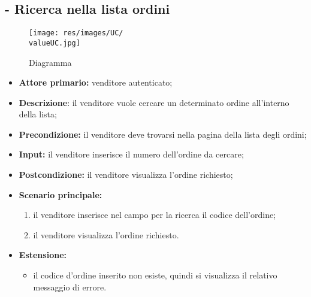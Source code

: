 \subsection{- Ricerca nella lista ordini}
\begin{figure}[H]
    \centering
    \texttt{[image: res/images/UC/\\valueUC.jpg]}
    \caption{Diagramma }
\end{figure}
\begin{itemize}
    \item \textbf{Attore primario:} venditore autenticato;
    \item \textbf{Descrizione}: il venditore vuole cercare un determinato ordine all'interno della lista;
    \item \textbf{Precondizione:} il venditore deve trovarsi nella pagina della lista degli ordini;
    \item \textbf{Input:} il venditore inserisce il numero dell'ordine da cercare;
    \item \textbf{Postcondizione:} il venditore visualizza l'ordine richiesto;
    \item \textbf{Scenario principale:}
        \begin{enumerate}
            \item il venditore inserisce nel campo per la ricerca il codice dell'ordine;
            \item il venditore visualizza l'ordine richiesto.
        \end{enumerate}
    \item \textbf{Estensione:}
    \begin{itemize}
        \item il codice d'ordine inserito non esiste, quindi si visualizza il relativo messaggio di errore.
    \end{itemize}
\end{itemize}

\stepUserCase
